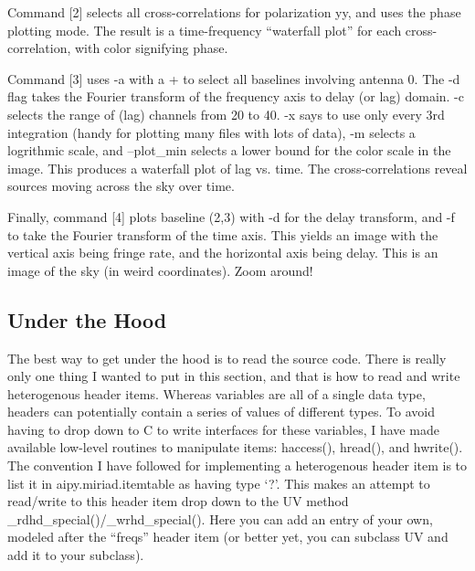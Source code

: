 Command [2] selects all cross-correlations for polarization yy, and uses
the phase plotting mode.  The result is a time-frequency ``waterfall plot''
for each cross-correlation, with color signifying phase.

Command [3] uses -a with a + to select all baselines involving antenna 0.  The
-d flag takes the Fourier transform of the frequency axis to delay (or lag)
domain.  -c selects the range of (lag) channels from 20 to 40.  -x says to use
only every 3rd integration (handy for plotting many files with lots of data),
-m selects a logrithmic scale, and --plot\_min selects a lower bound for the
color scale in the image.  This produces a waterfall plot of lag vs. time.  The
cross-correlations reveal sources moving across the sky over time.

Finally, command [4] plots baseline (2,3) with -d for the delay transform,
and -f to take the Fourier transform of the time axis.  This yields an
image with the vertical axis being fringe rate, and the horizontal axis being
delay.  This is an image of the sky (in weird coordinates).  Zoom around!

\subsection{Under the Hood}

The best way to get under the hood is to read the source code.  There is really
only one thing I wanted to put in this section, and that is how to read and
write heterogenous header items.  Whereas variables are all of a single data
type, headers can potentially contain a series of values of different types.
To avoid having to drop down to C to write interfaces for these variables, I
have made available low-level routines to manipulate items: haccess(), hread(),
and hwrite().  The convention I have followed for implementing a heterogenous
header item is to list it in aipy.miriad.itemtable as having type `?'.  This
makes an attempt to read/write to this header item drop down to the UV method
\_rdhd\_special()/\_wrhd\_special().  Here you can add an entry of your own,
modeled after the ``freqs'' header item (or better yet, you can subclass
UV and add it to your subclass).

